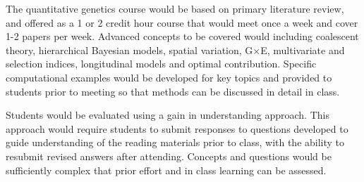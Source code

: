 \documentclass[11pt]{article}
\begin{document}
The quantitative genetics course would be based on primary literature review, and offered as a 1 or 2 credit hour course that would meet once a week and cover 1-2 papers per week. Advanced concepts to be covered would including coalescent theory, hierarchical Bayesian models, spatial variation, G$\times$E, multivariate and selection indices, longitudinal models and optimal contribution. Specific computational examples would be developed for key topics and provided to students prior to meeting so that methods can be discussed in detail in class. 

Students would be evaluated using a gain in understanding approach. This approach would require students to submit responses to questions developed to guide understanding of the reading materials prior to class, with the ability to resubmit revised answers after attending. Concepts and questions would be sufficiently complex that prior effort and in class learning can be assessed.











\end{document}
